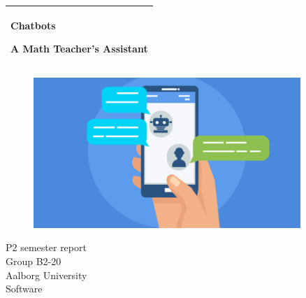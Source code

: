 %
%
%
%
%
%
\begin{titlepage}
  \addtolength{\hoffset}{0.5\evensidemargin-0.5\oddsidemargin} %
  \noindent%
  \begin{tabular}{@{}p{\textwidth}@{}}
    \toprule[2pt]
    \midrule
    \vspace{0.2cm}
    \begin{center}
        \Huge{\textbf{
            Chatbots
        }}
    \end{center}
    \begin{center}
        \Large{
            A Math Teacher's Assistant
        }
    \end{center}
    \vspace{0.2cm}\\
    \midrule
    \toprule[2pt]
  \end{tabular}
  \vspace{2 cm}
  \begin{center}
    \begin{figure}[htb]
        \centering
        \includegraphics[width=0.90\textwidth, frame]{figures/frontpage.png}
        \caption*{\nocite{1WyWFEbL1gWY_HjB_9t5PPQ.png800x450}}
        \end{figure}
    \end{center}
  \vfill
  \begin{center}
  P2 semester report\\
  \vspace{0.1cm}
  Group B2-20\\
  \vspace{0.4cm}
  Aalborg University\\
  \vspace{0.1cm}
  Software
  \end{center}
\end{titlepage}
\clearpage
